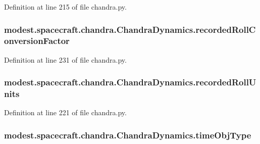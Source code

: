 Definition at line 215 of file chandra.\+py.

\subsubsection[{\texorpdfstring{recorded\+Roll\+Conversion\+Factor}{recordedRollConversionFactor}}]{\setlength{\rightskip}{0pt plus 5cm}modest.\+spacecraft.\+chandra.\+Chandra\+Dynamics.\+recorded\+Roll\+Conversion\+Factor}\hypertarget{classmodest_1_1spacecraft_1_1chandra_1_1ChandraDynamics_a75623219c9f19d354a55523742d7965e}{}\label{classmodest_1_1spacecraft_1_1chandra_1_1ChandraDynamics_a75623219c9f19d354a55523742d7965e}


Definition at line 231 of file chandra.\+py.

\subsubsection[{\texorpdfstring{recorded\+Roll\+Units}{recordedRollUnits}}]{\setlength{\rightskip}{0pt plus 5cm}modest.\+spacecraft.\+chandra.\+Chandra\+Dynamics.\+recorded\+Roll\+Units}\hypertarget{classmodest_1_1spacecraft_1_1chandra_1_1ChandraDynamics_ad99131d48ee842bbc401a560c199c744}{}\label{classmodest_1_1spacecraft_1_1chandra_1_1ChandraDynamics_ad99131d48ee842bbc401a560c199c744}


Definition at line 221 of file chandra.\+py.

\subsubsection[{\texorpdfstring{time\+Obj\+Type}{timeObjType}}]{\setlength{\rightskip}{0pt plus 5cm}modest.\+spacecraft.\+chandra.\+Chandra\+Dynamics.\+time\+Obj\+Type}\hypertarget{classmodest_1_1spacecraft_1_1chandra_1_1ChandraDynamics_abe97d4114895e675fc0e5088235d8c9c}{}\label{classmodest_1_1spacecraft_1_1chandra_1_1ChandraDynamics_abe97d4114895e675fc0e5088235d8c9c}


